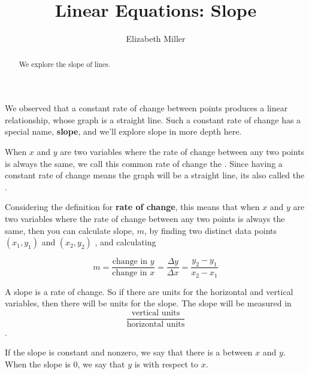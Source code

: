 \documentclass[nooutcomes]{ximera}
\author{Elizabeth Miller}
\title{Linear Equations: Slope}
\begin{document}
\begin{abstract}
  We explore the slope of lines.
\end{abstract}
\maketitle







We observed that a constant rate of change between points produces a linear relationship, whose graph is a straight line. Such a constant rate of change has a special name, \textbf{slope}, and we'll explore slope in more depth here.


\begin{definition}
 When $x$ and $y$ are two variables where the rate of change between any two points is always the same, we call this common rate of change the . Since having a constant rate of change means the graph will be a straight line, its also called the .
\end{definition}


Considering the definition for \textbf{rate of change}, this means that when $x$  and $y$  are two variables where the rate of change between any two points is always the same, then you can calculate slope, $m$, by finding two distinct data points $(x_1,y_1)$ and $(x_2,y_2)$ ,  and calculating 

$$ m=\frac{\text{change in } y}{\text{change in } x} = \frac{\Delta y}{\Delta x} = \frac{y_2-y_1}{x_2-x_1}$$

A slope is a rate of change. So if there are units for the horizontal and vertical variables, then there will be units for the slope. The slope will be measured in $$\frac{\text{vertical units}}{\text{horizontal units}}$$.  

\begin{definition}
If the slope is constant and nonzero, we say that there is a  between $x$ and $y$.  When the slope is 0,  we say that $y$  is  with respect to $x$. 
\end{definition}
\end{document}
